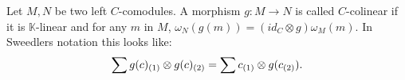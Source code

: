 \documentclass[../thesis.tex]{subfiles}
\begin{document}
\begin{definition}[Comodules]
    
    
    
    
    
                        
    
            \end{definition}

            \begin{definition}
                Let $M,N$ be two left $C$-comodules. A morphism $g:M\rightarrow N$ is called $C$-colinear if it is $\mathbb{K}$-linear and for any $m$ in $M$, $\omega_N(g(m)) = (id_C\otimes g)\omega_M(m)$. In Sweedlers notation this looks like:
                \begin{align*}
                    \sum g(c)_{(1)}\otimes g(c)_{(2)} = \sum c_{(1)}\otimes g(c_{(2)})\tt{.}
                \end{align*}
            \end{definition}
\end{document}
